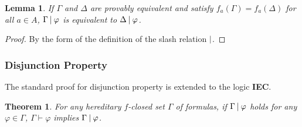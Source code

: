 \documentclass[doctor]{iscs-thesis}
\newcommand{\iec}{{\rm {\textbf{IEC}}}}
\newtheorem{lemma}{Lemma}
\newtheorem{theorem}{Theorem}
\begin{document}
\begin{lemma}
 \label{equiv}
 If $\Gamma$ and $\Delta$ are provably equivalent and satisfy
 $f_a(\Gamma) = f_a(\Delta)$ for all $a\in A$,
 $\Gamma\mathbin{\mid}\varphi$ is equivalent to $\Delta\mathbin{\mid}\varphi$.
\end{lemma}
\begin{proof}
 By the form of the definition of the slash relation $\mathbin{\mid}$.
\end{proof}

\subsubsection{Disjunction Property}

The standard proof for disjunction property is extended to the logic \iec.

\begin{theorem}
\label{slashcomp}
For any hereditary $f$-closed set $\Gamma$ of formulas, 
 if $\Gamma\mathbin{\mid}\varphi$ holds for any $\varphi \in \Gamma$\kern -1pt,
 $\Gamma\vdash\varphi$ implies $\Gamma\mathbin{\mid}\varphi$.
\end{theorem}
\end{document}
